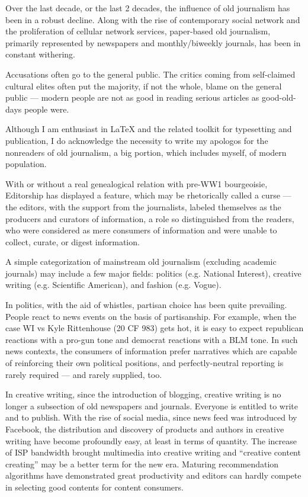

Over the last decade, or the last 2 decades, the influence of old journalism has been in a robust decline.
Along with the rise of contemporary social network and the proliferation of cellular network services,
paper-based old journalism, primarily represented by newspapers and monthly/biweekly journals,
has been in constant withering.

Accusations often go to the general public.
The critics coming from self-claimed cultural elites often put the majority, if not the whole, blame on the general public ---
modern people are not as good in reading serious articles as good-old-days people were.

Although I am enthusiast in \LaTeX{} and the related toolkit for typesetting and publication,
I do acknowledge the necessity to write my apologos for the nonreaders of old journalism,
a big portion, which includes myself, of modern population.


With or without a real genealogical relation with pre-WW1 bourgeoisie,
Editorship has displayed a feature, which may be rhetorically called a curse ---
the editors, with the support from the journalists,
labeled themselves as the producers and curators of information,
a role so distinguished from the readers,
who were considered as mere consumers of information and were unable to collect, curate, or digest information.

A simple categorization of mainstream old journalism (excluding academic journals) may include a few major fields:
politics (e.g. National Interest),
creative writing (e.g. Scientific American),
and fashion (e.g. Vogue).

In politics, with the aid of whistles, partisan choice has been quite prevailing.
People react to news events on the basis of partisanship.
For example, when the case WI vs Kyle Rittenhouse (20 CF 983) gets hot,
it is easy to expect republican reactions with a pro-gun tone and democrat reactions with a BLM tone.
In such news contexts, the consumers of information prefer narratives
which are capable of reinforcing their own political positions,
and perfectly-neutral reporting is rarely required --- and rarely supplied, too.

In creative writing, since the introduction of blogging,
creative writing is no longer a subsection of old newspapers and journals.
Everyone is entitled to write and to publish.
With the rise of social media, since news feed was introduced by Facebook,
the distribution and discovery of products and authors in creative writing have become profoundly easy,
at least in terms of quantity.
The increase of ISP bandwidth brought multimedia into creative writing and ``creative content creating''
may be a better term for the new era.
Maturing recommendation algorithms have demonstrated great productivity
and editors can hardly compete in selecting good contents for content consumers.

